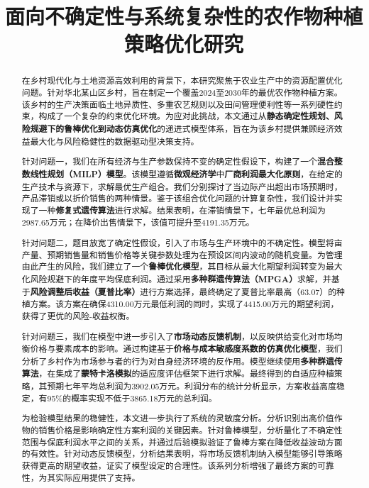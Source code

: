 \documentclass[withoutpreface,bwprint]{cumcmthesis} %
\title{面向不确定性与系统复杂性的农作物种植策略优化研究}
\begin{document}
\maketitle
\begin{abstract}
在乡村现代化与土地资源高效利用的背景下，本研究聚焦于农业生产中的资源配置优化问题。针对华北某山区乡村，旨在制定一个覆盖2024至2030年的最优农作物种植方案。该乡村的生产决策面临土地异质性、多重农艺规则以及田间管理便利性等一系列硬性约束，构成了一个复杂的约束优化环境。为应对此挑战，本文通过从\textbf{静态确定性规划、风险规避下的鲁棒优化到动态仿真优化}的递进式模型体系，旨在为该乡村提供兼顾经济效益最大化与风险稳健性的数据驱动型决策支持。

针对问题一，我们在所有经济与生产参数保持不变的确定性假设下，构建了一个\textbf{混合整数线性规划（MILP）模型}。该模型遵循\textbf{微观经济学}中\textbf{厂商利润最大化原则}，在给定的生产技术与资源下，求解最优生产组合。我们分别探讨了当边际产出超出市场预期时，产品滞销或以折价销售的两种情景。鉴于该组合优化问题的计算复杂性，我们设计并实现了一种\textbf{修复式遗传算法}进行求解。结果表明，在滞销情景下，七年最优总利润为2987.65万元；在降价出售情景下，该值可提升至4191.35万元。

针对问题二，题目放宽了确定性假设，引入了市场与生产环境中的不确定性。模型将亩产量、预期销售量和销售价格等关键参数处理为在预设区间内波动的随机变量。为管理由此产生的风险，我们建立了一个\textbf{鲁棒优化模型}，其目标从最大化期望利润转变为最大化风险规避下的年度平均保底利润。通过采用\textbf{多种群遗传算法（MPGA）}求解，并基于\textbf{风险调整后收益（夏普比率）}进行方案选择，最终确定了夏普比率最高（63.07）的种植方案。该方案在确保4310.00万元最低利润的同时，实现了4415.00万元的期望利润，获得了更优的风险-收益权衡。

针对问题三，我们在模型中进一步引入了\textbf{市场动态反馈机制}，以反映供给变化对市场均衡价格与要素成本的影响。通过构建基于\textbf{价格与成本敏感度系数的仿真优化模型}，我们分析了乡村作为市场参与者的行为对自身经济环境的反作用。模型继续使用\textbf{多种群遗传算法}，在集成了\textbf{蒙特卡洛模拟}的适应度评估框架下进行求解。最终得到的自适应种植策略，其预期七年平均总利润为3902.05万元。利润分布的统计分析显示，方案收益高度稳定，有95\%的概率实现不低于3865.18万元的总利润。

为检验模型结果的稳健性，本文进一步执行了系统的灵敏度分析。分析识别出高价值作物的销售价格是影响确定性方案利润的关键因素。针对鲁棒模型，分析量化了不确定性范围与保底利润水平之间的关系，并通过后验模拟验证了鲁棒方案在降低收益波动方面的有效性。针对动态反馈模型，分析结果表明，将市场反馈机制纳入模型能够引导策略获得更高的期望收益，证实了模型设定的合理性。该系列分析增强了最终方案的可靠性，为其实际应用提供了支持。





\end{abstract}








% 
% 
% 
% 
% 









\newpage



\newpage
\end{document}
